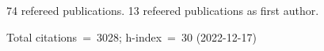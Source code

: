 74 refereed publications. 13 refeered publications as first author.

Total citations~=~3028; h-index~=~30 (2022-12-17)